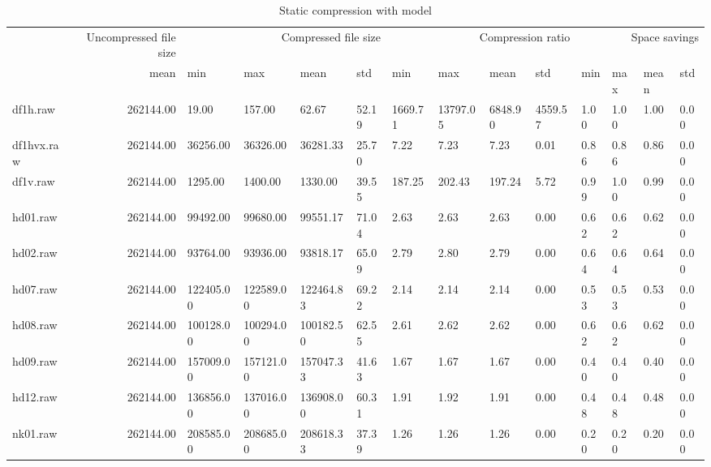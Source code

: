\begin{table}
\caption{Static compression with model}
\begin{tabular}{lrllllllllllll}
 & Uncompressed file size & \multicolumn{4}{r}{Compressed file size} & \multicolumn{4}{r}{Compression ratio} & \multicolumn{4}{r}{Space savings} \\
 & mean & min & max & mean & std & min & max & mean & std & min & max & mean & std \\
df1h.raw & 262144.00 & 19.00 & 157.00 & 62.67 & 52.19 & 1669.71 & 13797.05 & 6848.90 & 4559.57 & 1.00 & 1.00 & 1.00 & 0.00 \\
df1hvx.raw & 262144.00 & 36256.00 & 36326.00 & 36281.33 & 25.70 & 7.22 & 7.23 & 7.23 & 0.01 & 0.86 & 0.86 & 0.86 & 0.00 \\
df1v.raw & 262144.00 & 1295.00 & 1400.00 & 1330.00 & 39.55 & 187.25 & 202.43 & 197.24 & 5.72 & 0.99 & 1.00 & 0.99 & 0.00 \\
hd01.raw & 262144.00 & 99492.00 & 99680.00 & 99551.17 & 71.04 & 2.63 & 2.63 & 2.63 & 0.00 & 0.62 & 0.62 & 0.62 & 0.00 \\
hd02.raw & 262144.00 & 93764.00 & 93936.00 & 93818.17 & 65.09 & 2.79 & 2.80 & 2.79 & 0.00 & 0.64 & 0.64 & 0.64 & 0.00 \\
hd07.raw & 262144.00 & 122405.00 & 122589.00 & 122464.83 & 69.22 & 2.14 & 2.14 & 2.14 & 0.00 & 0.53 & 0.53 & 0.53 & 0.00 \\
hd08.raw & 262144.00 & 100128.00 & 100294.00 & 100182.50 & 62.55 & 2.61 & 2.62 & 2.62 & 0.00 & 0.62 & 0.62 & 0.62 & 0.00 \\
hd09.raw & 262144.00 & 157009.00 & 157121.00 & 157047.33 & 41.63 & 1.67 & 1.67 & 1.67 & 0.00 & 0.40 & 0.40 & 0.40 & 0.00 \\
hd12.raw & 262144.00 & 136856.00 & 137016.00 & 136908.00 & 60.31 & 1.91 & 1.92 & 1.91 & 0.00 & 0.48 & 0.48 & 0.48 & 0.00 \\
nk01.raw & 262144.00 & 208585.00 & 208685.00 & 208618.33 & 37.39 & 1.26 & 1.26 & 1.26 & 0.00 & 0.20 & 0.20 & 0.20 & 0.00 \\
\end{tabular}
\end{table}
